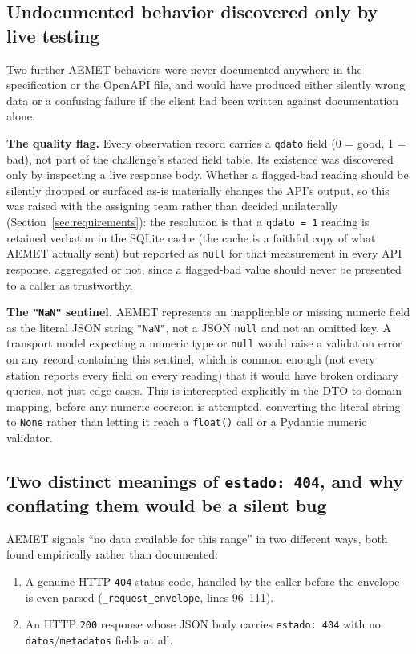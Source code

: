 \documentclass[11pt,a4paper]{article}
\begin{document}
\subsection{Undocumented behavior discovered only by live testing}

Two further AEMET behaviors were never documented anywhere in the
specification or the OpenAPI file, and would have produced either silently
wrong data or a confusing failure if the client had been written against
documentation alone.

\textbf{The quality flag.} Every observation record carries a
\texttt{qdato} field (0 = good, 1 = bad), not part of the challenge's
stated field table. Its existence was discovered only by inspecting a live
response body. Whether a flagged-bad reading should be silently dropped or
surfaced as-is materially changes the API's output, so this was raised with
the assigning team rather than decided unilaterally (Section~\ref{sec:requirements}):
the resolution is that a \texttt{qdato = 1} reading is retained verbatim in
the SQLite cache (the cache is a faithful copy of what AEMET actually sent)
but reported as \texttt{null} for that measurement in every API response,
aggregated or not, since a flagged-bad value should never be presented to a
caller as trustworthy.

\textbf{The \texttt{"NaN"} sentinel.} AEMET represents an inapplicable or
missing numeric field as the literal JSON string \texttt{"NaN"}, not a JSON
\texttt{null} and not an omitted key. A transport model expecting a numeric
type or \texttt{null} would raise a validation error on any record
containing this sentinel, which is common enough (not every station reports
every field on every reading) that it would have broken ordinary queries,
not just edge cases. This is intercepted explicitly in the DTO-to-domain
mapping, before any numeric coercion is attempted, converting the literal
string to \texttt{None} rather than letting it reach a
\texttt{float()} call or a Pydantic numeric validator.

\subsection{Two distinct meanings of \texttt{estado: 404}, and why conflating them would be a silent bug}

AEMET signals ``no data available for this range'' in two different ways,
both found empirically rather than documented:

\begin{enumerate}[nosep]
    \item A genuine HTTP \texttt{404} status code, handled by the caller
    before the envelope is even parsed (\texttt{\_request\_envelope},
    lines 96--111).
    \item An HTTP \texttt{200} response whose JSON body carries
    \texttt{estado: 404} with no \texttt{datos}/\texttt{metadatos} fields
    at all.
\end{enumerate}
\end{document}
